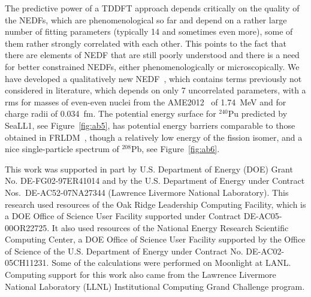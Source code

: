 \documentclass{webofc}
\begin{document}
The predictive power of a TDDFT approach depends critically on the
quality of the NEDFs, which are phenomenological so far and depend on a
rather large number of fitting parameters (typically 14 and sometimes even more),
some of them rather strongly correlated with each other. This points to the fact
that there are elements of NEDF that are still poorly understood
and there is a need for better constrained NEDFs, either phenomenologically or microscopically.
We have developed a qualitatively
new NEDF~\cite{NEDF}, which contains terms previously not considered in literature,
which depends on only 7 uncorrelated parameters, with a rms for masses of even-even nuclei
from the AME2012~\cite{ame2012} of 1.74~MeV and for charge radii of 0.034~fm.
The potential energy surface for $^{240}$Pu predicted by SeaLL1, see Figure~\ref{fig:ab5},
has potential energy barriers comparable to those obtained in FRLDM~\cite{LDM},
though a relatively low energy of the fission isomer, and a nice single-particle spectrum of
$^{208}$Pb, see Figure~\ref{fig:ab6}.



This work was supported in part by U.S. Department of Energy (DOE)
Grant No. DE-FG02-97ER41014 and by the U.S. Department of Energy under Contract Nos.\
DE-AC52-07NA27344 (Lawrence Livermore National Laboratory).
This research used resources of the Oak Ridge Leadership Computing Facility, which is a DOE Office of Science User Facility supported under Contract DE-AC05-00OR22725.
It also used resources of the National Energy Research Scientific Computing Center, a DOE Office of Science User Facility supported by the Office of Science of the U.S. Department of Energy under Contract No. DE-AC02-05CH11231.
Some of the calculations were performed on Moonlight at LANL.
Computing support for this work also came from the Lawrence Livermore National
Laboratory (LLNL) Institutional Computing Grand Challenge program.
\end{document}
